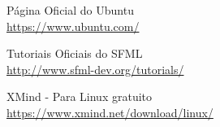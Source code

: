 \documentclass[a4paper,11pt]{article}
\begin{document}


\begin{thebibliography}{4}
  Página Oficial do Ubuntu \\
  \url{https://www.ubuntu.com/}

  Tutoriais Oficiais do SFML \\
  \url{http://www.sfml-dev.org/tutorials/}

  XMind - Para Linux gratuito \\
  \url{https://www.xmind.net/download/linux/}
  
  
\end{thebibliography}
  
\end{document}
